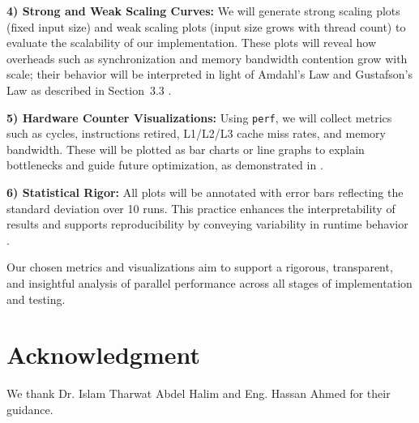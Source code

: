 \documentclass[conference, 10pt]{IEEEtran}
\begin{document}
\textbf{4) Strong and Weak Scaling Curves:} 
We will generate strong scaling plots (fixed input size) and weak scaling plots (input size grows with thread count) to evaluate the scalability of our implementation. These plots will reveal how overheads such as synchronization and memory bandwidth contention grow with scale; their behavior will be interpreted in light of Amdahl’s Law and Gustafson’s Law as described in Section~3.3 \cite{hager2021hpc, Gustafson1988}.

\vspace{0.5em}
\textbf{5) Hardware Counter Visualizations:} 
Using \texttt{perf}, we will collect metrics such as cycles, instructions retired, L1/L2/L3 cache miss rates, and memory bandwidth. These will be plotted as bar charts or line graphs to explain bottlenecks and guide future optimization, as demonstrated in \cite{Yoon2012}.

\vspace{0.5em}
\textbf{6) Statistical Rigor:} 
All plots will be annotated with error bars reflecting the standard deviation over 10 runs. This practice enhances the interpretability of results and supports reproducibility by conveying variability in runtime behavior \cite{Yoon2012}.

Our chosen metrics and visualizations aim to support a rigorous, transparent, and insightful analysis of parallel performance across all stages of implementation and testing.








\section*{Acknowledgment} 
We thank Dr. Islam Tharwat Abdel Halim and Eng. Hassan Ahmed for their guidance.


 
\end{document}
